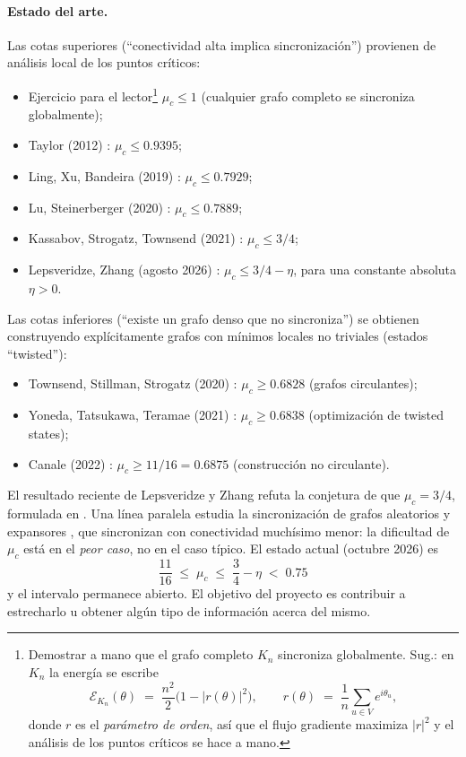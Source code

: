 \documentclass[11pt,a4paper]{article}
\begin{document}
\paragraph{Estado del arte.}
Las cotas superiores (``conectividad alta implica sincronización'') provienen de análisis local de los puntos críticos:
\begin{itemize}
    \item Ejercicio para el lector\footnote{Demostrar a mano que el grafo completo $K_n$ sincroniza globalmente. Sug.: en $K_n$ la energía se escribe
    \[
    \mathcal{E}_{K_n}(\theta) \;=\; \frac{n^2}{2}\bigl(1 - |r(\theta)|^2\bigr),
    \qquad
    r(\theta) \;=\; \frac{1}{n}\sum_{u\in V} e^{i\theta_u},
    \]
    donde $r$ es el \emph{parámetro de orden}, así que el flujo gradiente maximiza
    $|r|^2$ y el análisis de los puntos críticos se hace a mano.} $\mu_c\le 1$ (cualquier grafo completo se sincroniza globalmente);
    \item Taylor (2012) \cite{taylor2012}: $\mu_c \le 0{.}9395$;
    \item Ling, Xu, Bandeira (2019) \cite{ling2019}: $\mu_c \le 0{.}7929$;
    \item Lu, Steinerberger (2020) \cite{lu-steinerberger}: $\mu_c \le 0{.}7889$;
    \item Kassabov, Strogatz, Townsend (2021) \cite{kst2021}: $\mu_c \le 3/4$;
    \item {Lepsveridze, Zhang (agosto 2026)} \cite{lepsveridze-zhang}: $\mu_c \le 3/4 - \eta$, para una constante absoluta $\eta>0$.
\end{itemize}
Las cotas inferiores (``existe un grafo denso que no sincroniza'') se obtienen construyendo explícitamente grafos con mínimos locales no triviales (estados ``twisted''):
\begin{itemize}
    \item Townsend, Stillman, Strogatz (2020) \cite{tss2020}: $\mu_c \ge 0{.}6828$ (grafos circulantes);
    \item Yoneda, Tatsukawa, Teramae (2021) \cite{yoneda2021}: $\mu_c \ge 0{.}6838$ (optimización de twisted states);
    \item Canale (2022) \cite{canale2022}: $\mu_c \ge 11/16 = 0{.}6875$ (construcción no circulante).
\end{itemize}
El resultado reciente de Lepsveridze y Zhang \cite{lepsveridze-zhang} refuta la conjetura de que $\mu_c = 3/4$, formulada en \cite{bkmr2025}. Una línea paralela estudia la sincronización de grafos aleatorios y expansores \cite{abdalla2022}, que sincronizan con conectividad muchísimo menor: la dificultad de $\mu_c$ está en el \emph{peor caso}, no en el caso típico. El estado actual (octubre 2026) es
\[
\boxed{\;\dfrac{11}{16}\;\le\;\mu_c\;\le\;\dfrac{3}{4}-\eta\;<\;0{.}75\;}
\]
y el intervalo permanece abierto. El objetivo del proyecto es contribuir a estrecharlo u obtener algún tipo de información acerca del mismo.
\end{document}
